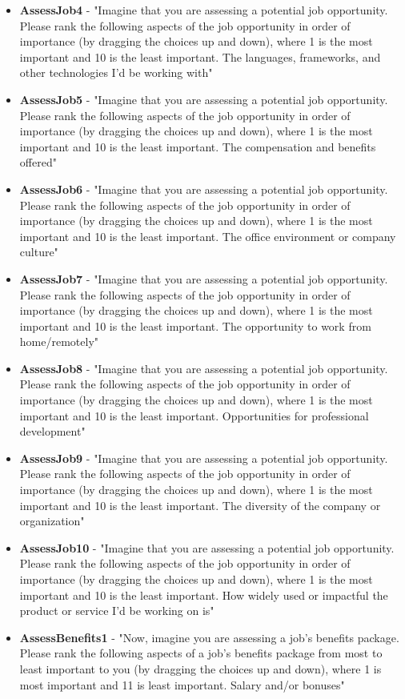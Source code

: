 \begin{appendices}
\begin{itemize}
        \item \textbf{AssessJob4} - "Imagine that you are assessing a potential job opportunity. Please rank the following aspects of the job opportunity in order of importance (by dragging the choices up and down), where 1 is the most important and 10 is the least important. The languages, frameworks, and other technologies I'd be working with"
        \item \textbf{AssessJob5} - "Imagine that you are assessing a potential job opportunity. Please rank the following aspects of the job opportunity in order of importance (by dragging the choices up and down), where 1 is the most important and 10 is the least important. The compensation and benefits offered"
        \item \textbf{AssessJob6} - "Imagine that you are assessing a potential job opportunity. Please rank the following aspects of the job opportunity in order of importance (by dragging the choices up and down), where 1 is the most important and 10 is the least important. The office environment or company culture"
        \item \textbf{AssessJob7} - "Imagine that you are assessing a potential job opportunity. Please rank the following aspects of the job opportunity in order of importance (by dragging the choices up and down), where 1 is the most important and 10 is the least important. The opportunity to work from home/remotely"
        \item \textbf{AssessJob8} - "Imagine that you are assessing a potential job opportunity. Please rank the following aspects of the job opportunity in order of importance (by dragging the choices up and down), where 1 is the most important and 10 is the least important. Opportunities for professional development"
        \item \textbf{AssessJob9} - "Imagine that you are assessing a potential job opportunity. Please rank the following aspects of the job opportunity in order of importance (by dragging the choices up and down), where 1 is the most important and 10 is the least important. The diversity of the company or organization"
        \item \textbf{AssessJob10} - "Imagine that you are assessing a potential job opportunity. Please rank the following aspects of the job opportunity in order of importance (by dragging the choices up and down), where 1 is the most important and 10 is the least important. How widely used or impactful the product or service I'd be working on is"
        \item \textbf{AssessBenefits1} - "Now, imagine you are assessing a job's benefits package. Please rank the following aspects of a job's benefits package from most to least important to you (by dragging the choices up and down), where 1 is most important and 11 is least important. Salary and/or bonuses"

\end{itemize}
\end{appendices}
